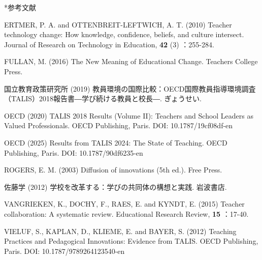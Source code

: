 \documentclass[a4paper,10pt,twocolumn]{ltjsarticle}
\makeatletter
\renewcommand{\section}{\@startsection{section}{1}{\z@}{1.1\Cvs \@plus.4\Cdp \@minus.2\Cdp}{.5\Cvs \@plus.2\Cdp}{\normalfont\gtfamily\bfseries\large}}
\makeatother
\begin{document}
\section*{参考文献}
\begingroup\footnotesize\setlength{\parindent}{0pt}\raggedright
\par{}\zw{} ERTMER, P. A. and OTTENBREIT-LEFTWICH, A. T. (2010) Teacher technology change: How knowledge, confidence, beliefs, and culture intersect. Journal of Research on Technology in Education, \textbf{42} (3) ：255-284.\vspace{2pt}
\par{}\zw{} FULLAN, M. (2016) The New Meaning of Educational Change. Teachers College Press.\vspace{2pt}
\par{}\zw{} 国立教育政策研究所 (2019) 教員環境の国際比較：OECD国際教員指導環境調査（TALIS）2018報告書―学び続ける教員と校長―. ぎょうせい.\vspace{2pt}
\par{}\zw{} OECD (2020) TALIS 2018 Results (Volume II): Teachers and School Leaders as Valued Professionals. OECD Publishing, Paris. DOI: 10.1787/19cf08df-en\vspace{2pt}
\par{}\zw{} OECD (2025) Results from TALIS 2024: The State of Teaching. OECD Publishing, Paris. DOI: 10.1787/90df6235-en\vspace{2pt}
\par{}\zw{} ROGERS, E. M. (2003) Diffusion of innovations (5th ed.). Free Press.\vspace{2pt}
\par{}\zw{} 佐藤学 (2012) 学校を改革する：学びの共同体の構想と実践. 岩波書店.\vspace{2pt}
\par{}\zw{} VANGRIEKEN, K., DOCHY, F., RAES, E. and KYNDT, E. (2015) Teacher collaboration: A systematic review. Educational Research Review, \textbf{15} ：17-40.\vspace{2pt}
\par{}\zw{} VIELUF, S., KAPLAN, D., KLIEME, E. and BAYER, S. (2012) Teaching Practices and Pedagogical Innovations: Evidence from TALIS. OECD Publishing, Paris. DOI: 10.1787/9789264123540-en\vspace{2pt}
\endgroup
\end{document}
